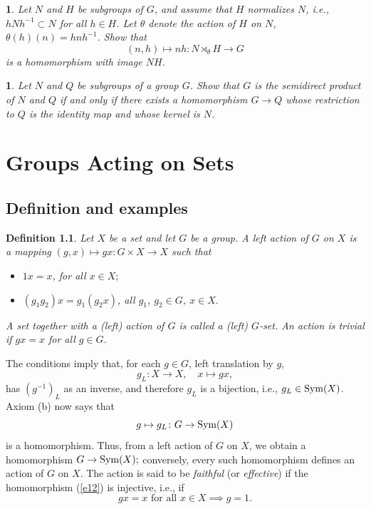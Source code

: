 \documentclass[a4paper,11pt,final,openany]{memoir}%
\newtheorem{definition}[X]{Definition}
\newtheorem{exercise}[Y]{}
\theoremstyle{nonumberplain}
\begin{document}
\begin{exercise}
\label{x19d}Let $N$ and $H$ be subgroups of $G$, and assume that $H$
normalizes $N$, i.e., $hNh^{-1}\subset N$ for all $h\in H$. Let $\theta$
denote the action of $H$ on $N$, $\theta(h)(n)=hnh^{-1}$. Show that%
\[
(n,h)\mapsto nh\colon N\rtimes_{\theta}H\rightarrow G
\]
is a homomorphism with image $NH$.
\end{exercise}

\begin{exercise}
\label{x19e}Let $N$ and $Q$ be subgroups of a group $G$. Show that $G$ is the
semidirect product of $N$ and $Q$ if and only if there exists a homomorphism
$G\rightarrow Q$ whose restriction to $Q$ is the identity map and whose kernel
is $N$.
\end{exercise}

\clearpage


\chapter{Groups Acting on Sets}

\section{Definition and examples}

\begin{definition}
\label{ga01} Let $X$ be a set and let $G$ be a group. A \emph{left action\/}%
of $G$ on $X$ is a mapping $(g,x)\mapsto gx\colon G\times X\rightarrow X$ such that

\begin{itemize}
\item[(a)] $1x=x$, for all $x\in X;$

\item[(b)] $(g_{1}g_{2})x=g_{1}(g_{2}x)$, all $g_{1}$, $g_{2}\in G$, $x\in X.$
\end{itemize}

\noindent A set together with a (left) action of $G$ is called a (left)
$G$\emph{-set}.%
An action is \emph{trivial}
%
if $gx=x$ for all $g\in G$.
\end{definition}

The conditions imply that, for each $g\in G$, left translation by $g$,
\[
g_{L}\colon X\rightarrow X,\quad x\mapsto gx,
\]
has $(g^{-1})_{L}$ as an inverse, and therefore $g_{L}$ is a bijection, i.e.,
$g_{L}\in\operatorname{Sym}(X)$. Axiom (b) now says that
\begin{equation}
g\mapsto g_{L}\colon G\rightarrow\Sym(X) \label{e12}%
\end{equation}
is a homomorphism. Thus, from a left action of $G$ on $X$, we obtain a
homomorphism $G\rightarrow\operatorname{Sym}(X);$ conversely, every such homomorphism
defines an action of $G$ on $X$. The action is said to be \emph{faithful}%
(or \emph{effective})%
if the homomorphism (\ref{e12}) is injective, i.e., if%
\[
gx=x\text{ for all }x\in X\implies g=1.
\]
\end{document}
